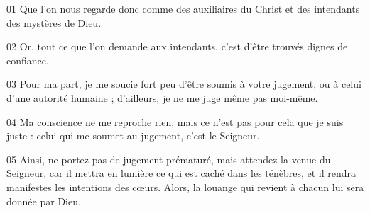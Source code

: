 01 Que l’on nous regarde donc comme des auxiliaires du Christ et des intendants des mystères de Dieu.

02 Or, tout ce que l’on demande aux intendants, c’est d’être trouvés dignes de confiance.

03 Pour ma part, je me soucie fort peu d’être soumis à votre jugement, ou à celui d’une autorité humaine ; d’ailleurs, je ne me juge même pas moi-même.

04 Ma conscience ne me reproche rien, mais ce n’est pas pour cela que je suis juste : celui qui me soumet au jugement, c’est le Seigneur.

05 Ainsi, ne portez pas de jugement prématuré, mais attendez la venue du Seigneur, car il mettra en lumière ce qui est caché dans les ténèbres, et il rendra manifestes les intentions des cœurs. Alors, la louange qui revient à chacun lui sera donnée par Dieu.
